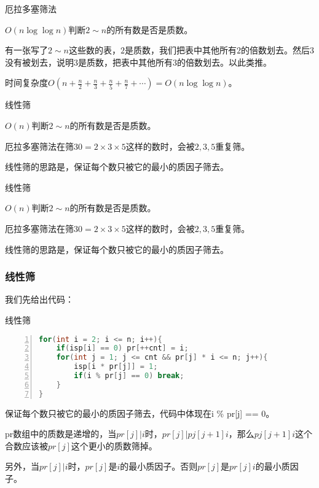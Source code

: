 \documentclass{ctexbeamer}        %
\begin{document}
\begin{frame}{厄拉多塞筛法}
\begin{example}[厄拉多塞筛法]
    $O(n\log \log n)$判断$2 \sim n$的所有数是否是质数。
\end{example}
有一张写了$2\sim n$这些数的表，$2$是质数，我们把表中其他所有$2$的倍数划去。然后$3$没有被划去，说明$3$是质数，把表中其他所有$3$的倍数划去。以此类推。

时间复杂度$O(n+\frac{n}{2}+\frac{n}{3}+\frac{n}{5}+\frac{n}{7}+\cdots)=O(n\log\log n)$。
\end{frame}

\begin{frame}{线性筛}
\begin{example}[线性筛]
    $O(n)$判断$2 \sim n$的所有数是否是质数。
\end{example}
厄拉多塞筛法在筛$30=2\times 3 \times 5$这样的数时，会被$2,3,5$重复筛。

线性筛的思路是，保证每个数只被它的最小的质因子筛去。
\end{frame}

\begin{frame}{线性筛}
\begin{example}[线性筛]
    $O(n)$判断$2 \sim n$的所有数是否是质数。
\end{example}
厄拉多塞筛法在筛$30=2\times 3 \times 5$这样的数时，会被$2,3,5$重复筛。

线性筛的思路是，保证每个数只被它的最小的质因子筛去。
\end{frame}

\begin{frame}[fragile]
\frametitle{线性筛}

我们先给出代码：
\begin{block}{线性筛}
\begin{lstlisting}[language={c++},
                   numbers=left]
for(int i = 2; i <= n; i++){
    if(isp[i] == 0) pr[++cnt] = i;
    for(int j = 1; j <= cnt && pr[j] * i <= n; j++){  
        isp[i * pr[j]] = 1;  
        if(i % pr[j] == 0) break;  
    }  
}
\end{lstlisting}
\end{block}
保证每个数只被它的最小的质因子筛去，代码中体现在i \% pr[j] == 0。

pr数组中的质数是递增的，当$pr[j]|i$时，$pr[j]|pj[j+1]i$，那么$pj[j+1]i$这个合数应该被$pr[j]$这个更小的质数筛掉。

另外，当$pr[j]|i$时，$pr[j]$是$i$的最小质因子。否则$pr[j]$是$pr[j]i$的最小质因子。
\end{frame}
\end{document}
